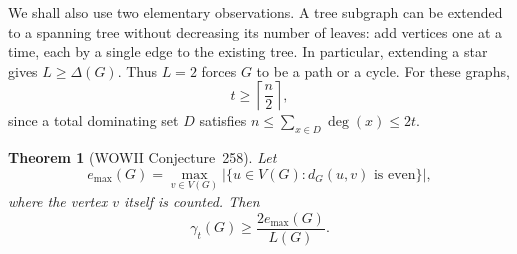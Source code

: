 \documentclass[11pt,a4paper]{article}
\newtheorem{theorem}{Theorem}[section]
\theoremstyle{remark}
\begin{document}
We shall also use two elementary observations. A tree subgraph can be
extended to a spanning tree without decreasing its number of leaves:
add vertices one at a time, each by a single edge to the existing tree.
In particular, extending a star gives $L\geq\Delta(G)$. Thus $L=2$
forces $G$ to be a path or a cycle. For these graphs,
\begin{equation}
\label{eq:newtd-degree-two}
 t\geq \left\lceil\frac n2\right\rceil,
\end{equation}
since a total dominating set $D$ satisfies
$n\leq\sum_{x\in D}\deg(x)\leq 2t$.

\begin{theorem}[WOWII Conjecture~258]
\label{thm:newtd-258}
Let
\[
 e_{\max}(G)=\max_{v\in V(G)}
 \bigl|\{u\in V(G):d_G(u,v)\text{ is even}\}\bigr|,
\]
where the vertex $v$ itself is counted. Then
\begin{equation}
\label{eq:newtd-258}
 \gamma_t(G)\geq\frac{2e_{\max}(G)}{L(G)}.
\end{equation}
\end{theorem}
\end{document}
